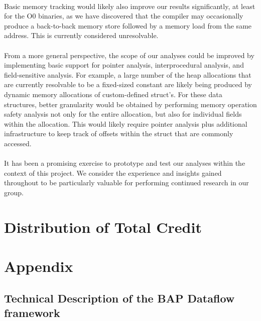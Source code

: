 \documentclass[letterpaper,11pt]{article}
\begin{document}
\paragraph{}
Basic memory tracking would likely also improve our results significantly, at
least for the O0 binaries, as we have discovered that the compiler may
occasionally produce a back-to-back memory store followed by a memory load from
the same address. This is currently considered unresolvable.

\paragraph{}
From a more general perspective, the scope of our analyses could be improved by
implementing basic support for pointer analysis, interprocedural analysis, and
field-sensitive analysis. For example, a large number of the heap allocations
that are currently resolvable to be a fixed-sized constant are likely being
produced by dynamic memory allocations of custom-defined struct’s. For these
data structures, better granularity would be obtained by performing memory
operation safety analysis not only for the entire allocation, but also for
individual fields within the allocation. This would likely require pointer
analysis plus additional infrastructure to keep track of offsets within the
struct that are commonly accessed.

\paragraph{}
It has been a promising exercise to prototype and test our
analyses within the context of this project. We consider the experience and
insights gained throughout to be particularly valuable for performing continued
research in our group.

\section{Distribution of Total Credit}

\clearpage

\appendix
\section{Appendix}
\label{appa1}
\subsection{Technical Description of the BAP Dataflow framework}
\end{document}
